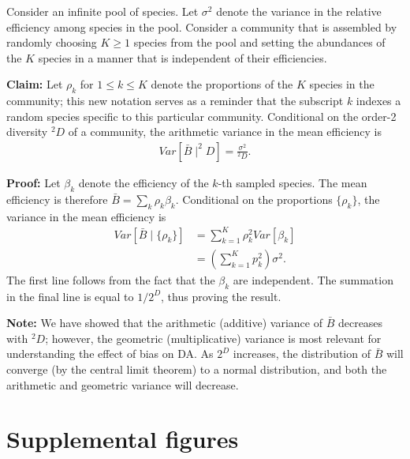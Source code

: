 \documentclass[
]{article}
\begin{document}
Consider an infinite pool of species.
Let \(\sigma^{2}\) denote the variance in the relative efficiency among species in the pool.
Consider a community that is assembled by randomly choosing \(K \ge 1\) species from the pool and setting the abundances of the \(K\) species in a manner that is independent of their efficiencies.

\textbf{Claim:}
Let \(\rho_{k}\) for \(1 \le k \le K\) denote the proportions of the \(K\) species in the community; this new notation serves as a reminder that the subscript \(k\) indexes a random species specific to this particular community.
Conditional on the order-2 diversity \(^2D\) of a community, the arithmetic variance in the mean efficiency is
\begin{align}
  Var[\bar B \mid ^2D] 
  = \frac{\sigma^2}{^2D}.
\end{align}

\textbf{Proof:} Let \(\beta_{k}\) denote the efficiency of the \(k\)-th sampled species.
The mean efficiency is therefore \(\bar B = \sum_k \rho_k \beta_k\).
Conditional on the proportions \(\{\rho_{k}\}\), the variance in the mean efficiency is
\begin{align}
  Var[\bar B \mid \{\rho_{k}\}]
  &= \sum_{k=1}^K \rho_k^2 Var[\beta_k]
  \\&= \left(\sum_{k=1}^K p_k^2\right) \sigma^2.
\end{align}
The first line follows from the fact that the \(\beta_{k}\) are independent.
The summation in the final line is equal to \(1/2^D\), thus proving the result.

\textbf{Note:}
We have showed that the arithmetic (additive) variance of \(\bar B\) decreases with \(^2D\); however, the geometric (multiplicative) variance is most relevant for understanding the effect of bias on DA.
As \(2^D\) increases, the distribution of \(\bar B\) will converge (by the central limit theorem) to a normal distribution, and both the arithmetic and geometric variance will decrease.

\hypertarget{supplemental-figures}{%
\section{Supplemental figures}\label{supplemental-figures}}
\end{document}
